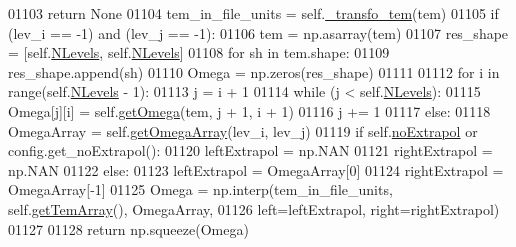 \begin{DoxyCode}
01103             \textcolor{keywordflow}{return} \textcolor{keywordtype}{None}            
01104         tem\_in\_file\_units = self.\hyperlink{classpyneb_1_1core_1_1pynebcore_1_1___coll_data_ascii_aaf268c621d916f4ea71bb5825e249200}{\_transfo\_tem}(tem)
01105         \textcolor{keywordflow}{if} (lev\_i == -1) \textcolor{keywordflow}{and} (lev\_j == -1):
01106             tem = np.asarray(tem)
01107             res\_shape = [self.\hyperlink{classpyneb_1_1core_1_1pynebcore_1_1___coll_data_ascii_a718c85715ee6ef5dfdd4136e2031030b}{NLevels}, self.\hyperlink{classpyneb_1_1core_1_1pynebcore_1_1___coll_data_ascii_a718c85715ee6ef5dfdd4136e2031030b}{NLevels}]
01108             \textcolor{keywordflow}{for} sh \textcolor{keywordflow}{in} tem.shape:
01109                 res\_shape.append(sh)
01110             Omega = np.zeros(res\_shape)
01111     
01112             \textcolor{keywordflow}{for} i \textcolor{keywordflow}{in} range(self.\hyperlink{classpyneb_1_1core_1_1pynebcore_1_1___coll_data_ascii_a718c85715ee6ef5dfdd4136e2031030b}{NLevels} - 1):
01113                 j = i + 1
01114                 \textcolor{keywordflow}{while} (j < self.\hyperlink{classpyneb_1_1core_1_1pynebcore_1_1___coll_data_ascii_a718c85715ee6ef5dfdd4136e2031030b}{NLevels}):
01115                     Omega[j][i] = self.\hyperlink{classpyneb_1_1core_1_1pynebcore_1_1___coll_data_ascii_a2f99c08a0f6a46d88b6e09b0a36495c2}{getOmega}(tem, j + 1, i + 1)
01116                     j += 1
01117         \textcolor{keywordflow}{else}:
01118             OmegaArray = self.\hyperlink{classpyneb_1_1core_1_1pynebcore_1_1___coll_data_ascii_ac78bf2ddca80543884f09c2924308351}{getOmegaArray}(lev\_i, lev\_j)
01119             \textcolor{keywordflow}{if} self.\hyperlink{classpyneb_1_1core_1_1pynebcore_1_1___coll_data_ascii_aa4f6c8d0a2a8e4ac6503d67b4a51188d}{noExtrapol} \textcolor{keywordflow}{or} config.get\_noExtrapol():
01120                 leftExtrapol = np.NAN
01121                 rightExtrapol = np.NAN
01122             \textcolor{keywordflow}{else}:
01123                 leftExtrapol = OmegaArray[0]
01124                 rightExtrapol = OmegaArray[-1]
01125             Omega = np.interp(tem\_in\_file\_units, self.\hyperlink{classpyneb_1_1core_1_1pynebcore_1_1___coll_data_ascii_aaf234dd4932c7f789eb8eaaf6a16cfc9}{getTemArray}(), OmegaArray,
01126                               left=leftExtrapol, right=rightExtrapol)
01127         
01128         \textcolor{keywordflow}{return} np.squeeze(Omega)
    
\end{DoxyCode}
